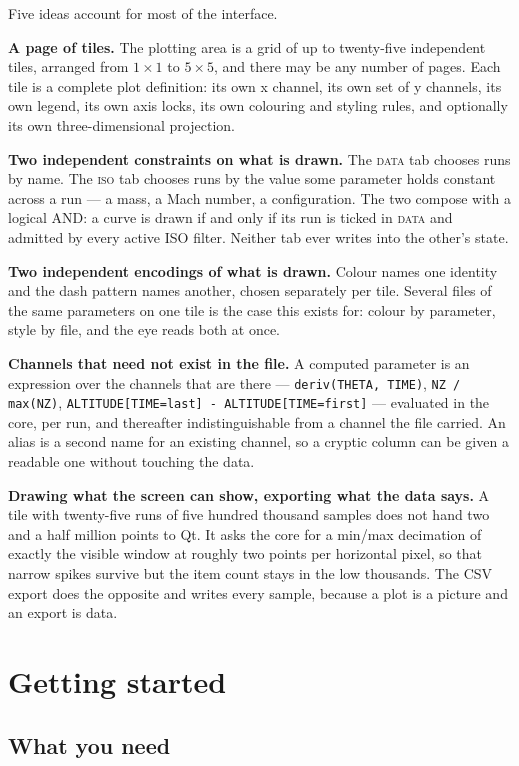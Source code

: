 \documentclass[11pt,a4paper,oneside]{report}
\newcommand{\code}[1]{\texttt{#1}}
\newcommand{\tab}[1]{\textsc{#1}}
\begin{document}
Five ideas account for most of the interface.

\textbf{A page of tiles.} The plotting area is a grid of up to twenty-five
independent tiles, arranged from $1 \times 1$ to $5 \times 5$, and there may be
any number of pages. Each tile is a complete plot definition: its own x channel,
its own set of y channels, its own legend, its own axis locks, its own colouring
and styling rules, and optionally its own three-dimensional projection.

\textbf{Two independent constraints on what is drawn.} The \tab{data} tab
chooses runs by name. The \tab{iso} tab chooses runs by the value some parameter
holds constant across a run --- a mass, a Mach number, a configuration. The two
compose with a logical AND: a curve is drawn if and only if its run is ticked in
\tab{data} and admitted by every active ISO filter. Neither tab ever writes into
the other's state.

\textbf{Two independent encodings of what is drawn.} Colour names one identity
and the dash pattern names another, chosen separately per tile. Several files of
the same parameters on one tile is the case this exists for: colour by
parameter, style by file, and the eye reads both at once.

\textbf{Channels that need not exist in the file.} A computed parameter is an
expression over the channels that are there ---
\code{deriv(THETA, TIME)}, \code{NZ / max(NZ)},
\code{ALTITUDE[TIME=last] - ALTITUDE[TIME=first]} --- evaluated in the core,
per run, and thereafter indistinguishable from a channel the file carried. An
alias is a second name for an existing channel, so a cryptic column can be given
a readable one without touching the data.

\textbf{Drawing what the screen can show, exporting what the data says.} A tile
with twenty-five runs of five hundred thousand samples does not hand two and a
half million points to Qt. It asks the core for a min/max decimation of exactly
the visible window at roughly two points per horizontal pixel, so that narrow
spikes survive but the item count stays in the low thousands. The CSV export
does the opposite and writes every sample, because a plot is a picture and an
export is data.

\chapter{Getting started}

\section{What you need}
\end{document}
